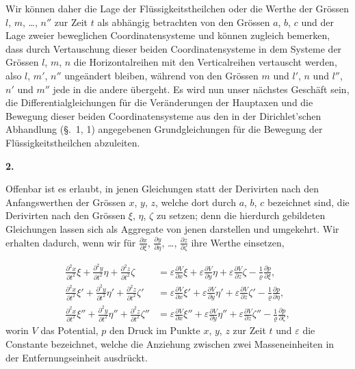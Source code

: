 \documentclass[12pt,a4paper]{article}
\begin{document}
Wir k\"onnen daher die Lage der Fl\"ussigkeitstheilchen oder die Werthe der Gr\"ossen $l$, $m$, \dots, $n''$ zur Zeit $t$ als abh\"angig betrachten von den Gr\"ossen $a$, $b$, $c$ und der Lage zweier beweglichen Coordinatensysteme und k\"onnen zugleich bemerken, dass durch Vertauschung dieser beiden Coordinatensysteme in dem Systeme der Gr\"ossen $l$, $m$, $n$ die Horizontalreihen mit den Verticalreihen vertauscht werden, also $l$, $m'$, $n''$ unge\"andert bleiben, w\"ahrend von den Gr\"ossen $m$ und $l'$, $n$ und $l''$, $n'$ und $m''$ jede in die andere \"ubergeht. Es wird nun unser n\"achstes Gesch\"aft sein, die Differentialgleichungen f\"ur die Ver\"anderungen der Hauptaxen und die Bewegung dieser beiden Coordinatensysteme aus den in der Dirichlet'schen Abhandlung (\S.~1, 1) angegebenen Grundgleichungen f\"ur die Bewegung der Fl\"ussigkeitstheilchen abzuleiten.

\begin{center}
\textbf{2.}
\end{center}

Offenbar ist es erlaubt, in jenen Gleichungen statt der Derivirten nach den Anfangswerthen der Gr\"ossen $x$, $y$, $z$, welche dort durch $a$, $b$, $c$ bezeichnet sind, die Derivirten nach den Gr\"ossen $\xi$, $\eta$, $\zeta$ zu setzen; denn die hierdurch gebildeten Gleichungen lassen sich als Aggregate von jenen darstellen und umgekehrt. Wir erhalten dadurch, wenn wir f\"ur $\frac{\partial x}{\partial\xi}$, $\frac{\partial y}{\partial\eta}$, \dots, $\frac{\partial z}{\partial\zeta}$ ihre Werthe einsetzen,

\begin{align*}
\frac{\partial^{2}x}{\partial t^{2}}\xi + \frac{\partial^{2}y}{\partial t^{2}}\eta + \frac{\partial^{2}z}{\partial t^{2}}\zeta &= \varepsilon\frac{\partial V}{\partial x}\xi + \varepsilon\frac{\partial V}{\partial y}\eta + \varepsilon\frac{\partial V}{\partial z}\zeta - \frac{1}{\varrho}\frac{\partial p}{\partial\xi},\\
\frac{\partial^{2}x}{\partial t^{2}}\xi' + \frac{\partial^{2}y}{\partial t^{2}}\eta' + \frac{\partial^{2}z}{\partial t^{2}}\zeta' &= \varepsilon\frac{\partial V}{\partial x}\xi' + \varepsilon\frac{\partial V}{\partial y}\eta' + \varepsilon\frac{\partial V}{\partial z}\zeta' - \frac{1}{\varrho}\frac{\partial p}{\partial\eta},\\
\frac{\partial^{2}x}{\partial t^{2}}\xi'' + \frac{\partial^{2}y}{\partial t^{2}}\eta'' + \frac{\partial^{2}z}{\partial t^{2}}\zeta'' &= \varepsilon\frac{\partial V}{\partial x}\xi'' + \varepsilon\frac{\partial V}{\partial y}\eta'' + \varepsilon\frac{\partial V}{\partial z}\zeta'' - \frac{1}{\varrho}\frac{\partial p}{\partial\zeta},\tag{1}
\end{align*}
worin $V$ das Potential, $p$ den Druck im Punkte $x$, $y$, $z$ zur Zeit $t$ und $\varepsilon$ die Constante bezeichnet, welche die Anziehung zwischen zwei Masseneinheiten in der Entfernungseinheit ausdr\"uckt.
\end{document}
